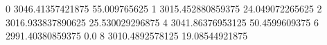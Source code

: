 0 3046.41357421875 55.009765625
1 3015.452880859375 24.049072265625
2 3016.933837890625 25.530029296875
4 3041.86376953125 50.4599609375
6 2991.40380859375 0.0
8 3010.4892578125 19.08544921875
